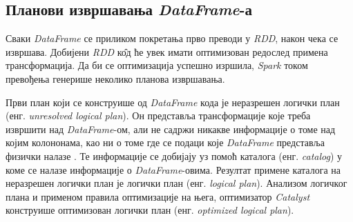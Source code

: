 \documentclass[12pt,oneside]{memoir}
\begin{document}
\subsection{Планови извршавања \textit{DataFrame}-а}
\label{subsec:spark_exec_plans}


Сваки \textit{DataFrame} се приликом покретања прво преводи у \textit{RDD}, након чека се извршава. Добијени \textit{RDD} к\^{о}д ће увек имати оптимизован редослед примена трансформација. Да би се оптимизација успешно изршила, \textit{Spark} током превођења генерише неколико планова извршавања.

Први план који се конструише од \textit{DataFrame} кода је неразрешен логички план (енг. \textit{unresolved logical plan}). Он представља трансформације које треба извршити над \textit{DataFrame}-ом, али не садржи никакве информације о томе над којим колононама, као ни о томе где се подаци које \textit{DataFrame} представља физички налазе \cite{spark_guide}. Те информације се добијају уз помоћ каталога (енг. \textit{catalog}) у коме се налазе информације о \textit{DataFrame}-овима. Резултат примене каталога на неразрешен логички план је логички план (енг. \textit{logical plan}). Анализом логичког плана и применом правила оптимизације на њега, оптимизатор \textit{Catalyst} конструише оптимизован логички план (енг. \textit{optimized logical plan}).


\end{document}
